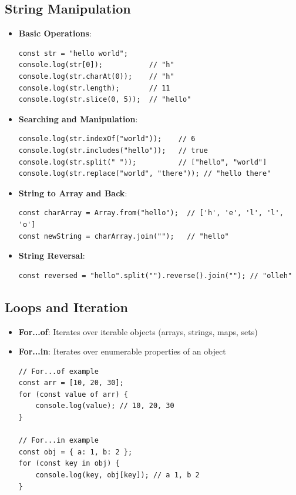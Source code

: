 \documentclass{article}
\begin{document}
\subsection{String Manipulation}
\begin{itemize}
    \item \textbf{Basic Operations}:
    \begin{lstlisting}
const str = "hello world";
console.log(str[0]);           // "h"
console.log(str.charAt(0));    // "h"
console.log(str.length);       // 11
console.log(str.slice(0, 5));  // "hello"
    \end{lstlisting}
    
    \item \textbf{Searching and Manipulation}:
    \begin{lstlisting}
console.log(str.indexOf("world"));    // 6
console.log(str.includes("hello"));   // true
console.log(str.split(" "));          // ["hello", "world"]
console.log(str.replace("world", "there")); // "hello there"
    \end{lstlisting}
    
    \item \textbf{String to Array and Back}:
    \begin{lstlisting}
const charArray = Array.from("hello");  // ['h', 'e', 'l', 'l', 'o']
const newString = charArray.join("");   // "hello"
    \end{lstlisting}
    
    \item \textbf{String Reversal}:
    \begin{lstlisting}
const reversed = "hello".split("").reverse().join(""); // "olleh"
    \end{lstlisting}
\end{itemize}

\subsection{Loops and Iteration}
\begin{itemize}
    \item \textbf{For...of}: Iterates over iterable objects (arrays, strings, maps, sets)
    \item \textbf{For...in}: Iterates over enumerable properties of an object
    \begin{lstlisting}
// For...of example
const arr = [10, 20, 30];
for (const value of arr) {
    console.log(value); // 10, 20, 30
}

// For...in example
const obj = { a: 1, b: 2 };
for (const key in obj) {
    console.log(key, obj[key]); // a 1, b 2
}
    \end{lstlisting}
\end{itemize}
\end{document}
